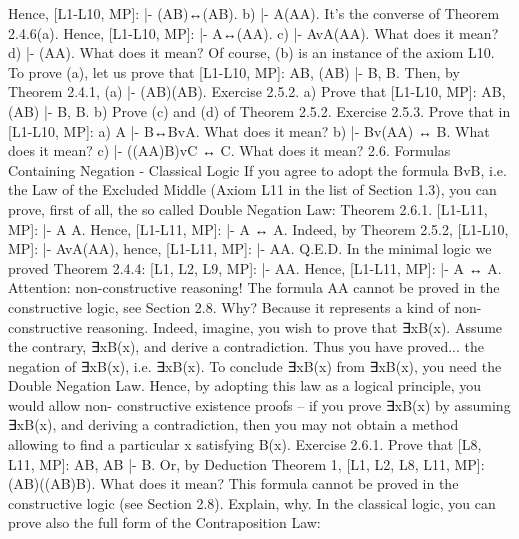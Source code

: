 Hence, [L1-L10, MP]: |- \neg \neg (A\IMPLIES B)↔(\neg \neg A\IMPLIES \neg \neg B).
b) |- \neg \neg A\IMPLIES (\neg A\IMPLIES A). It's the converse of Theorem 2.4.6(a). Hence, [L1-L10, MP]: |- \neg \neg A↔(\neg A\IMPLIES A).
c) |- Av\neg A\IMPLIES (\neg \neg A\IMPLIES A). What does it mean?
d) |- \neg \neg (\neg \neg A\IMPLIES A). What does it mean?
Of course, (b) is an instance of the axiom L10.
To prove (a), let us prove that [L1-L10, MP]: \neg \neg A\IMPLIES \neg \neg B, \neg (A\IMPLIES B) |- \neg B, \neg \neg B. Then, by Theorem 2.4.1,
(a) |- (\neg \neg A\IMPLIES \neg \neg B)\IMPLIES \neg \neg (A\IMPLIES B).
Exercise 2.5.2. a) Prove that [L1-L10, MP]: \neg \neg A\IMPLIES \neg \neg B, \neg (A\IMPLIES B) |- \neg B, \neg \neg B.
b) Prove (c) and (d) of Theorem 2.5.2.
Exercise 2.5.3. Prove that in [L1-L10, MP]:
a) A |- B↔Bv\neg A. What does it mean?
b) |- Bv(A\AND \neg A) ↔ B. What does it mean?
c) |- ((A\AND \neg A)\AND B)vC ↔ C. What does it mean?
2.6. Formulas Containing Negation - Classical Logic
If you agree to adopt the formula Bv\neg B, i.e. the Law of the Excluded Middle (Axiom L11 in the list of
Section 1.3), you can prove, first of all, the so called Double Negation Law:
Theorem 2.6.1. [L1-L11, MP]: |- \neg \neg A \IMPLIES  A. Hence, [L1-L11, MP]: |- \neg \neg A ↔ A.
Indeed, by Theorem 2.5.2, [L1-L10, MP]: |- Av\neg A\IMPLIES (\neg \neg A\IMPLIES A), hence, [L1-L11, MP]: |- \neg \neg A\IMPLIES A. Q.E.D.
In the minimal logic we proved Theorem 2.4.4: [L1, L2, L9, MP]: |- A\IMPLIES \neg \neg A. Hence, [L1-L11, MP]: |-
\neg \neg A ↔ A.
Attention: non-constructive reasoning! The formula \neg \neg A\IMPLIES A cannot be proved in the constructive
logic, see Section 2.8. Why? Because it represents a kind of non-constructive reasoning. Indeed, imagine,
you wish to prove that ∃xB(x). Assume the contrary, \neg ∃xB(x), and derive a contradiction. Thus you have
proved... the negation of \neg ∃xB(x), i.e. \neg  \neg ∃xB(x). To conclude ∃xB(x) from \neg  \neg ∃xB(x), you need the
Double Negation Law. Hence, by adopting this law as a logical principle, you would allow non-
constructive existence proofs – if you prove ∃xB(x) by assuming \neg ∃xB(x), and deriving a contradiction,
then you may not obtain a method allowing to find a particular x satisfying B(x).
Exercise 2.6.1. Prove that [L8, L11, MP]: A\IMPLIES B, \neg A\IMPLIES B |- B. Or, by Deduction Theorem 1, [L1, L2, L8,
L11, MP]: (A\IMPLIES B)\IMPLIES ((\neg A\IMPLIES B)\IMPLIES B). What does it mean? This formula cannot be proved in the
constructive logic (see Section 2.8). Explain, why.
In the classical logic, you can prove also the full form of the Contraposition Law:

